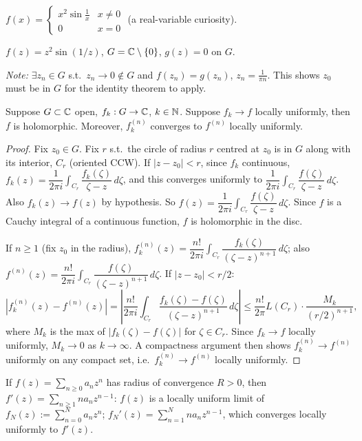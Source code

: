 \documentclass[11pt]{article}
\begin{document}
\begin{example}
$f(x) = \begin{cases} x^2\sin\frac1x & x\ne0 \\ 0 & x=0\end{cases}$ (a real-variable curiosity).
\end{example}

\begin{example}
$f(z) = z^2\sin(1/z)$, $G={\mathbb{C}}\setminus\{0\}$, $g(z)=0$ on $G$.

\emph{Note:} $\exists z_n\in G$ s.t.\ $z_n\to0\notin G$ and $f(z_n)=g(z_n)$, $z_n=\frac{1}{\pi n}$. This shows $z_0$ must be in $G$ for the identity theorem to apply.
\end{example}

\begin{theorem}
Suppose $G\subset{\mathbb{C}}$ open, $f_k:G\to{\mathbb{C}}$, $k\in{\mathbb{N}}$. Suppose $f_k\to f$ locally uniformly, then $f$ is holomorphic. Moreover, $f_k^{(n)}$ converges to $f^{(n)}$ locally uniformly.
\end{theorem}
\begin{proof}
Fix $z_0\in G$. Fix $r$ s.t.\ the circle of radius $r$ centred at $z_0$ is in $G$ along with its interior, $C_r$ (oriented CCW).
If $|z-z_0|<r$, since $f_k$ continuous, $f_k(z) = \dfrac{1}{2\pi i}\int_{C_r} \dfrac{f_k(\zeta)}{\zeta-z}\,d\zeta$, and this converges uniformly to $\dfrac{1}{2\pi i}\int_{C_r}\dfrac{f(\zeta)}{\zeta-z}\,d\zeta$. Also $f_k(z)\to f(z)$ by hypothesis. So $f(z) = \dfrac{1}{2\pi i}\int_{C_r}\dfrac{f(\zeta)}{\zeta-z}\,d\zeta$. Since $f$ is a Cauchy integral of a continuous function, $f$ is holomorphic in the disc.

If $n\ge1$ (fix $z_0$ in the radius), $f_k^{(n)}(z) = \dfrac{n!}{2\pi i}\int_{C_r} \dfrac{f_k(\zeta)}{(\zeta-z)^{n+1}}\,d\zeta$; also $f^{(n)}(z) = \dfrac{n!}{2\pi i}\int_{C_r}\dfrac{f(\zeta)}{(\zeta-z)^{n+1}}\,d\zeta$.
If $|z-z_0|<r/2$:
\[
\left|f_k^{(n)}(z)-f^{(n)}(z)\right| = \left|\frac{n!}{2\pi i}\int_{C_r} \frac{f_k(\zeta)-f(\zeta)}{(\zeta-z)^{n+1}}\,d\zeta\right| \le \frac{n!}{2\pi}L(C_r)\cdot \frac{M_k}{(r/2)^{n+1}},
\]
where $M_k$ is the max of $|f_k(\zeta)-f(\zeta)|$ for $\zeta\in C_r$. Since $f_k\to f$ locally uniformly, $M_k\to0$ as $k\to\infty$. A compactness argument then shows $f_k^{(n)} \to f^{(n)}$ uniformly on any compact set, i.e.\ $f_k^{(n)} \to f^{(n)}$ locally uniformly.
\end{proof}

\begin{corollary}
If $f(z)=\sum_{n\ge0} a_nz^n$ has radius of convergence $R>0$, then $f'(z)=\sum_{n\ge1} na_nz^{n-1}$: $f(z)$ is a locally uniform limit of $f_N(z):=\sum_{n=0}^N a_nz^n$; $f_N'(z) = \sum_{n=1}^N na_nz^{n-1}$, which converges locally uniformly to $f'(z)$.
\end{corollary}
\end{document}
